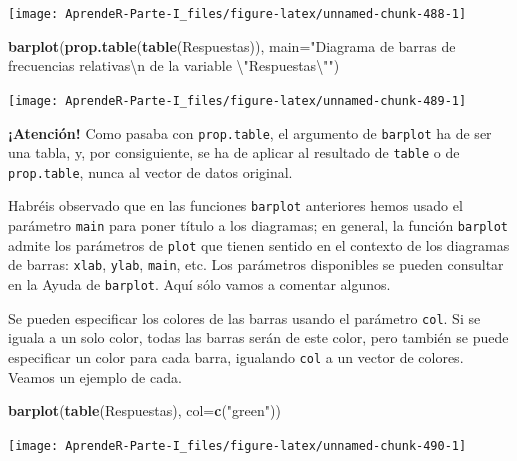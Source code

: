 \documentclass[]{book}
\newenvironment{Shaded}{\begin{snugshade}}{\end{snugshade}}
\newcommand{\CharTok}[1]{\textcolor[rgb]{0.31,0.60,0.02}{#1}}
\newcommand{\DataTypeTok}[1]{\textcolor[rgb]{0.13,0.29,0.53}{#1}}
\newcommand{\KeywordTok}[1]{\textcolor[rgb]{0.13,0.29,0.53}{\textbf{#1}}}
\newcommand{\NormalTok}[1]{#1}
\newcommand{\StringTok}[1]{\textcolor[rgb]{0.31,0.60,0.02}{#1}}
\theoremstyle{definition}
\theoremstyle{definition}
\theoremstyle{definition}
\theoremstyle{remark}
\begin{document}
\begin{center}\texttt{[image: AprendeR-Parte-I\_files/figure-latex/unnamed-chunk-488-1]} \end{center}

\begin{Shaded}
\begin{Highlighting}[]
\KeywordTok{barplot}\NormalTok{(}\KeywordTok{prop.table}\NormalTok{(}\KeywordTok{table}\NormalTok{(Respuestas)), }
        \DataTypeTok{main=}\StringTok{"Diagrama de barras de frecuencias relativas}\CharTok{\textbackslash{}n}\StringTok{ de la variable }\CharTok{\textbackslash{}"}\StringTok{Respuestas}\CharTok{\textbackslash{}"}\StringTok{"}\NormalTok{)}
\end{Highlighting}
\end{Shaded}

\begin{center}\texttt{[image: AprendeR-Parte-I\_files/figure-latex/unnamed-chunk-489-1]} \end{center}

\textbf{¡Atención!} Como pasaba con \texttt{prop.table}, el argumento de \texttt{barplot} ha de ser una tabla, y, por consiguiente, se ha de aplicar al resultado de \texttt{table} o de \texttt{prop.table}, nunca al vector de datos original.

Habréis observado que en las funciones \texttt{barplot} anteriores hemos usado el parámetro \texttt{main} para poner título a los diagramas; en general, la función \texttt{barplot} admite los parámetros de \texttt{plot} que tienen sentido en el contexto de los diagramas de barras: \texttt{xlab}, \texttt{ylab}, \texttt{main}, etc. Los parámetros disponibles se pueden consultar en la Ayuda de \texttt{barplot}. Aquí sólo vamos a comentar algunos.

Se pueden especificar los colores de las barras usando el parámetro \texttt{col}. Si se iguala a un solo color, todas las barras serán de este color, pero también se puede especificar un color para cada barra, igualando \texttt{col} a un vector de colores. Veamos un ejemplo de cada.

\begin{Shaded}
\begin{Highlighting}[]
\KeywordTok{barplot}\NormalTok{(}\KeywordTok{table}\NormalTok{(Respuestas), }\DataTypeTok{col=}\KeywordTok{c}\NormalTok{(}\StringTok{"green"}\NormalTok{))}
\end{Highlighting}
\end{Shaded}

\begin{center}\texttt{[image: AprendeR-Parte-I\_files/figure-latex/unnamed-chunk-490-1]} \end{center}
\end{document}
